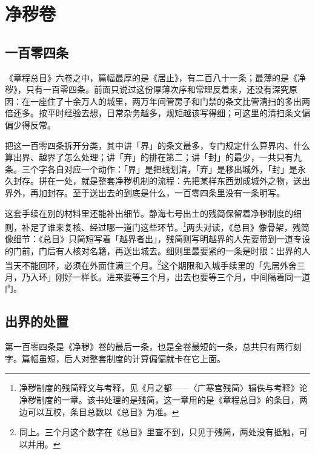 \chapter{净秽卷}


\section{一百零四条}

《章程总目》六卷之中，篇幅最厚的是《居止》，有二百八十一条；最薄的是《净秽》，只有一百零四条。前面只说过这份厚薄次序和常理反着来，还没有深究原因：在一座住了十余万人的城里，两万年间管房子和门禁的条文比管清扫的多出两倍还多。按平时经验去想，日常杂务越多，规矩越该写得细；可这里的清扫条文偏偏少得反常。

把这一百零四条拆开分类，其中讲「界」的条文最多，专门规定什么算界内、什么算出界、越界了怎么处理；讲「弃」的排在第二；讲「封」的最少，一共只有九条。三个字各自对应一个动作：「界」是把线划清，「弃」是移出城外，「封」是永久封存。拼在一处，就是整套净秽机制的流程：先把某样东西划成城外之物，送出界外，再加封存。至于送出去的到底是什么，一百零四条里没有一条明写。

这套手续在别的材料里还能补出细节。静海七号出土的残简保留着净秽制度的细则，补足了谁来复核、经过哪一道门这些环节。\footnote{净秽制度的残简释文与考释，见《月之都——〈广寒宫残简〉辑佚与考释》论净秽制度的一章。该书处理的是残简，这一章用的是《章程总目》的条目，两边可以互校，条目总数以《总目》为准。}两头对读，《总目》像骨架，残简像细节：《总目》只简短写着「越界者出」，残简则写明越界的人先要带到一道专设的门前，门后有人核对名籍，再送出城去。细则里最要紧的一条是时限：出界的人当天不能回环，必须在外面住满三个月。\footnote{同上。三个月这个数字在《总目》里查不到，只见于残简，两处没有抵触，可以并用。}这个期限和入城手续里的「先居外舍三月，乃入环」刚好一样长。进来要等三个月，出去也要等三个月，中间隔着同一道门。

\section{出界的处置}

第一百零四条是《净秽》卷的最后一条，也是全卷最短的一条，总共只有两行刻字。篇幅虽短，后人对整套制度的计算偏偏就卡在它上面。

